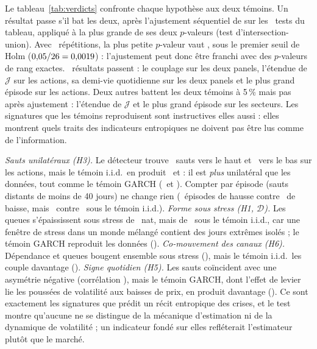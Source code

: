 \documentclass[12pt]{article}
\theoremstyle{definition}
\newcommand{\JJ}{\mathcal{J}}
\newcommand{\DD}{\mathcal{D}}
\begin{document}
\begin{doublespace}
Le tableau~\ref{tab:verdicts} confronte chaque hypothèse aux deux témoins.
Un résultat passe s'il bat les deux, après l'ajustement séquentiel de
\citet{holm1979} sur les \holmNtests\ tests du tableau, appliqué à la plus
grande de ses deux $p$-valeurs (test d'intersection-union). Avec \nRep\
répétitions, la plus petite $p$-valeur vaut \pMin, sous le premier seuil de
Holm ($0{,}05/26=0{,}0019$) : l'ajustement peut donc être
franchi avec des $p$-valeurs de rang exactes. \holmNsurv\ résultats passent :
le couplage sur les deux panels, l'étendue de $\JJ$ sur les actions, sa
demi-vie quotidienne sur les deux panels et le plus grand épisode sur les
actions. Deux autres battent les deux témoins à 5\,\% mais pas après
ajustement : l'étendue de $\JJ$ et le plus grand épisode sur les secteurs. Les
signatures que les témoins reproduisent sont instructives elles aussi : elles
montrent quels traits des indicateurs entropiques ne doivent pas être lus
comme de l'information.

\emph{Sauts unilatéraux (H3).} Le détecteur trouve \qJumpUpSpObs\ sauts vers
le haut et \qJumpDownSpObs\ vers le bas sur les actions, mais le témoin i.i.d.\
en produit \qJumpUpSpIid\ et \qJumpDownSpIid : il est \emph{plus} unilatéral
que les données, tout comme le témoin GARCH (\qJumpUpSpFhs\ et
\qJumpDownSpFhs). Compter par épisode (sauts distants de moins de 40 jours) ne
change rien (\qEpUpSpObs\ épisodes de hausse contre \qEpDownSpObs\ de baisse,
mais \qEpUpSpIid\ contre \qEpDownSpIid\ sous le témoin i.i.d.). \emph{Forme sous
stress (H1, $\DD$).} Les queues s'épaississent sous stress de
\qDgapSpObs~nat, mais de \qDgapSpIid\ sous le témoin i.i.d., car une fenêtre de
stress dans un monde mélangé contient des jours extrêmes isolés ; le témoin
GARCH reproduit les données (\qDgapSpFhs). \emph{Co-mouvement des canaux
(H6).} Dépendance et queues bougent ensemble sous stress
(\qHsixStressSpObs), mais le témoin i.i.d.\ les couple davantage
(\qHsixStressSpIid). \emph{Signe quotidien (H5).} Les sauts coïncident avec une
asymétrie négative (corrélation \qHfiveCorrSpObs), mais le témoin GARCH, dont
l'effet de levier lie les poussées de volatilité aux baisses de prix, en
produit davantage (\qHfiveCorrSpFhs). Ce sont exactement les signatures que
prédit un récit entropique des crises, et le test montre qu'aucune ne se
distingue de la mécanique d'estimation ni de la dynamique de volatilité ; un
indicateur fondé sur elles refléterait l'estimateur plutôt que le marché.


\end{doublespace}
\end{document}

